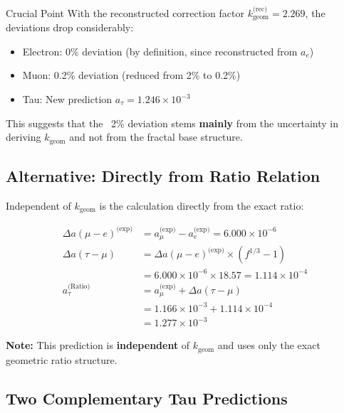 	\begin{important}{Crucial Point}
		With the reconstructed correction factor $k_{\text{geom}}^{\text{(rec)}} = 2.269$, the deviations drop considerably:
		\begin{itemize}
			\item Electron: 0\% deviation (by definition, since reconstructed from $a_e$)
			\item Muon: 0.2\% deviation (reduced from 2\% to 0.2\%)
			\item Tau: New prediction $a_\tau = 1.246 \times 10^{-3}$
		\end{itemize}
		
		This suggests that the ~2\% deviation stems \textbf{mainly} from the uncertainty in deriving $k_{\text{geom}}$ and not from the fractal base structure.
	\end{important}
	
	\subsection{Alternative: Directly from Ratio Relation}
	
	Independent of $k_{\text{geom}}$ is the calculation directly from the exact ratio:
	
	\begin{align}
		\Delta a(\mu-e)^{\text{(exp)}} &= a_\mu^{\text{(exp)}} - a_e^{\text{(exp)}} = 6.000 \times 10^{-6} \\
		\Delta a(\tau-\mu) &= \Delta a(\mu-e)^{\text{(exp)}} \times (f^{1/3} - 1) \\
		&= 6.000 \times 10^{-6} \times 18.57 = 1.114 \times 10^{-4} \\
		a_\tau^{\text{(Ratio)}} &= a_\mu^{\text{(exp)}} + \Delta a(\tau-\mu) \\
		&= 1.166 \times 10^{-3} + 1.114 \times 10^{-4} \\
		&= \boxed{1.277 \times 10^{-3}}
	\end{align}
	
	\textbf{Note:} This prediction is \textbf{independent} of $k_{\text{geom}}$ and uses only the exact geometric ratio structure.
	
	\subsection{Two Complementary Tau Predictions}
	
